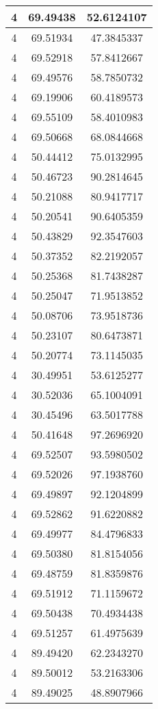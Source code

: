 \documentclass[
]{book}
\begin{document}
\begin{tabular}{c|c|c}
\hline
4 & 69.49438 & 52.6124107\\
\hline
4 & 69.51934 & 47.3845337\\
\hline
4 & 69.52918 & 57.8412667\\
\hline
4 & 69.49576 & 58.7850732\\
\hline
4 & 69.19906 & 60.4189573\\
\hline
4 & 69.55109 & 58.4010983\\
\hline
4 & 69.50668 & 68.0844668\\
\hline
4 & 50.44412 & 75.0132995\\
\hline
4 & 50.46723 & 90.2814645\\
\hline
4 & 50.21088 & 80.9417717\\
\hline
4 & 50.20541 & 90.6405359\\
\hline
4 & 50.43829 & 92.3547603\\
\hline
4 & 50.37352 & 82.2192057\\
\hline
4 & 50.25368 & 81.7438287\\
\hline
4 & 50.25047 & 71.9513852\\
\hline
4 & 50.08706 & 73.9518736\\
\hline
4 & 50.23107 & 80.6473871\\
\hline
4 & 50.20774 & 73.1145035\\
\hline
4 & 30.49951 & 53.6125277\\
\hline
4 & 30.52036 & 65.1004091\\
\hline
4 & 30.45496 & 63.5017788\\
\hline
4 & 50.41648 & 97.2696920\\
\hline
4 & 69.52507 & 93.5980502\\
\hline
4 & 69.52026 & 97.1938760\\
\hline
4 & 69.49897 & 92.1204899\\
\hline
4 & 69.52862 & 91.6220882\\
\hline
4 & 69.49977 & 84.4796833\\
\hline
4 & 69.50380 & 81.8154056\\
\hline
4 & 69.48759 & 81.8359876\\
\hline
4 & 69.51912 & 71.1159672\\
\hline
4 & 69.50438 & 70.4934438\\
\hline
4 & 69.51257 & 61.4975639\\
\hline
4 & 89.49420 & 62.2343270\\
\hline
4 & 89.50012 & 53.2163306\\
\hline
4 & 89.49025 & 48.8907966\\

\end{tabular}
\end{document}
